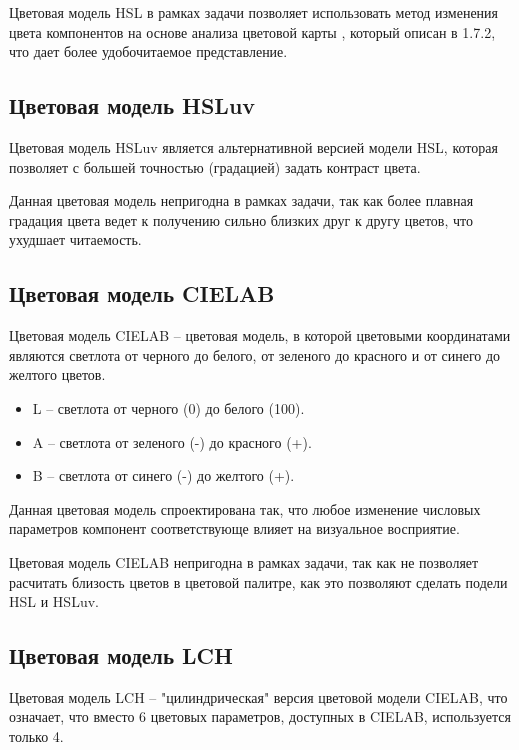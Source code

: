 Цветовая модель HSL в рамках задачи позволяет использовать метод изменения цвета компонентов на основе анализа цветовой карты \cite{colormap}, который описан в 1.7.2, что дает более удобочитаемое \cite{sitereadability} представление.

\subsection{Цветовая модель HSLuv}

Цветовая модель HSLuv является альтернативной версией модели HSL, которая позволяет с большей точностью (градацией) задать контраст цвета.

Данная цветовая модель непригодна в рамках задачи, так как более плавная градация цвета ведет к получению сильно близких друг к другу цветов, что ухудшает читаемость.

\subsection{Цветовая модель CIELAB}

Цветовая модель CIELAB -- цветовая модель, в которой цветовыми координатами являются светлота от черного до белого, от зеленого до красного и от синего до желтого цветов.

\begin{itemize}
	\item L -- светлота от черного (0) до белого (100).
	\item A -- светлота от зеленого (-) до красного (+).
	\item B -- светлота от синего (-) до желтого (+).
\end{itemize}

Данная цветовая модель спроектирована так, что любое изменение числовых параметров компонент соответствующе влияет на визуальное восприятие.

Цветовая модель CIELAB непригодна в рамках задачи, так как не позволяет расчитать близость цветов в цветовой палитре, как это позволяют сделать подели HSL и HSLuv.

\subsection{Цветовая модель LCH}

Цветовая модель LCH -- "цилиндрическая" версия цветовой модели CIELAB, что означает, что вместо 6 цветовых параметров, доступных в CIELAB, используется только 4.

